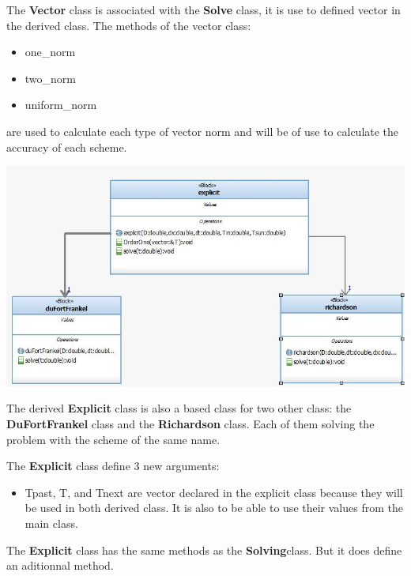\documentclass [10 pt, a4 paper]{article}
\begin{document}
\vspace{0.3cm}

The \textbf{Vector} class is associated with the \textbf{Solve} class, it is use to defined 
vector in the derived class.
The methods of the vector class:
\begin{itemize}
    \item one\_norm
    \item two\_norm
    \item uniform\_norm
\end{itemize}
are used to calculate each type of vector norm and will be of use to calculate the accuracy of each scheme.

\begin{center}
    \includegraphics[scale=0.6]{Chart/Explicit.JPG}
\end{center}

The derived \textbf{Explicit} class is also a based class for two other class: the \textbf{DuFortFrankel}
class and the \textbf{Richardson} class. Each of them solving the problem with the scheme of the same name.

\vspace{0.3cm}

The \textbf{Explicit} class define 3 new arguments:
\begin{itemize}
    \item Tpast, T, and Tnext are vector declared in the explicit class because they will be used
    in both derived class. It is also to be able to use their values from the main class.
\end{itemize}

The \textbf{Explicit} class has the same methods as the \textbf{Solving}class. But it does define an aditionnal method. 
\end{document}
